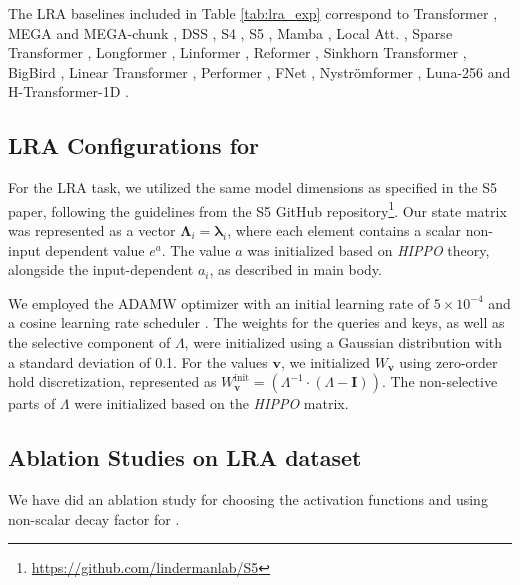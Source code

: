 The LRA baselines included in Table \ref{tab:lra_exp} correspond to Transformer \citep{vaswani_attention_2017}, MEGA and MEGA-chunk \citep{ma2022mega}, DSS \citep{gupta2022diagonalstatespaceseffective}, S4 \citep{gu2021efficiently}, S5 \citep{s5}, Mamba \citep{mamba}, Local Att. \citep{vaswani_attention_2017}, Sparse Transformer \citep{sparsetransformer}, Longformer \citep{Beltagy2020Longformer}, Linformer \citep{wang2020linformer}, Reformer \citep{kitaev2020reformerefficienttransformer}, Sinkhorn Transformer \citep{tay2020sinkhorn}, BigBird \citep{zaheer2020bigbirdtransformerslonger}, Linear Transformer \citep{trans_rnn}, Performer \citep{performer}, FNet \citep{leethorp2022fnetmixingtokensfourier}, Nyströmformer \citep{xiong2021nystromformernystrombasedalgorithmapproximating}, Luna-256 \citep{ma2021luna} and H-Transformer-1D \citep{zhu2021htransformer1dfastonedimensionalhierarchical}.

\subsection{LRA Configurations for \lion}
\label{lraconfig}
For the LRA task, we utilized the same model dimensions as specified in the S5 \citep{s5} paper, following the guidelines from the S5 GitHub repository\footnote{\url{https://github.com/lindermanlab/S5}}. Our state matrix was represented as a vector \(\boldsymbol{\Lambda}_i = \boldsymbol{\lambda}_i\), where each element contains a scalar non-input dependent value \(e^a\). The value \(a\) was initialized based on \textit{HIPPO} theory, alongside the input-dependent \(a_i\), as described in main body.

We employed the ADAMW optimizer with an initial learning rate of \(5 \times 10^{-4}\) and a cosine learning rate scheduler \citep{cossche}. The weights for the queries and keys, as well as the selective component of \(\Lambda\), were initialized using a Gaussian distribution with a standard deviation of 0.1. For the values \(\mathbf{v}\), we initialized \(W_\mathbf{v}\) using zero-order hold discretization, represented as \(W^{\text{init}}_\mathbf{v} = \left({\Lambda}^{-1} \cdot (\Lambda - \mathbf{I})\right)\). The non-selective parts of \(\Lambda\) were initialized based on the \textit{HIPPO} \citep{s5} matrix.


\subsection{Ablation Studies on LRA dataset} \label{laasjdhakjsdh}
We have did an ablation study for choosing the activation functions and using non-scalar decay factor for \lion.

